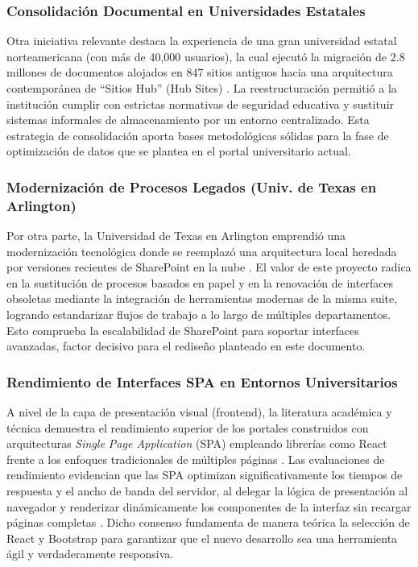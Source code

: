 \subsubsection*{Consolidación Documental en Universidades Estatales}

Otra iniciativa relevante destaca la experiencia de una gran universidad estatal norteamericana (con más de 40,000 usuarios), la cual ejecutó la migración de 2.8 millones de documentos alojados en 847 sitios antiguos hacia una arquitectura contemporánea de ``Sitios Hub'' (Hub Sites) \cite{casestateuniv2022}. La reestructuración permitió a la institución cumplir con estrictas normativas de seguridad educativa y sustituir sistemas informales de almacenamiento por un entorno centralizado. Esta estrategia de consolidación aporta bases metodológicas sólidas para la fase de optimización de datos que se plantea en el portal universitario actual.

\subsubsection*{Modernización de Procesos Legados (Univ. de Texas en Arlington)}

Por otra parte, la Universidad de Texas en Arlington emprendió una modernización tecnológica donde se reemplazó una arquitectura local heredada por versiones recientes de SharePoint en la nube \cite{caseuta2019}. El valor de este proyecto radica en la sustitución de procesos basados en papel y en la renovación de interfaces obsoletas mediante la integración de herramientas modernas de la misma suite, logrando estandarizar flujos de trabajo a lo largo de múltiples departamentos. Esto comprueba la escalabilidad de SharePoint para soportar interfaces avanzadas, factor decisivo para el rediseño planteado en este documento.

\subsubsection*{Rendimiento de Interfaces SPA en Entornos Universitarios}

A nivel de la capa de presentación visual (frontend), la literatura académica y técnica demuestra el rendimiento superior de los portales construidos con arquitecturas \textit{Single Page Application} (SPA) empleando librerías como React frente a los enfoques tradicionales de múltiples páginas \cite{mikowski2013single}. Las evaluaciones de rendimiento evidencian que las SPA optimizan significativamente los tiempos de respuesta y el ancho de banda del servidor, al delegar la lógica de presentación al navegador y renderizar dinámicamente los componentes de la interfaz sin recargar páginas completas \cite{flanagan2020javascript}. Dicho consenso fundamenta de manera teórica la selección de React y Bootstrap para garantizar que el nuevo desarrollo sea una herramienta ágil y verdaderamente responsiva.

